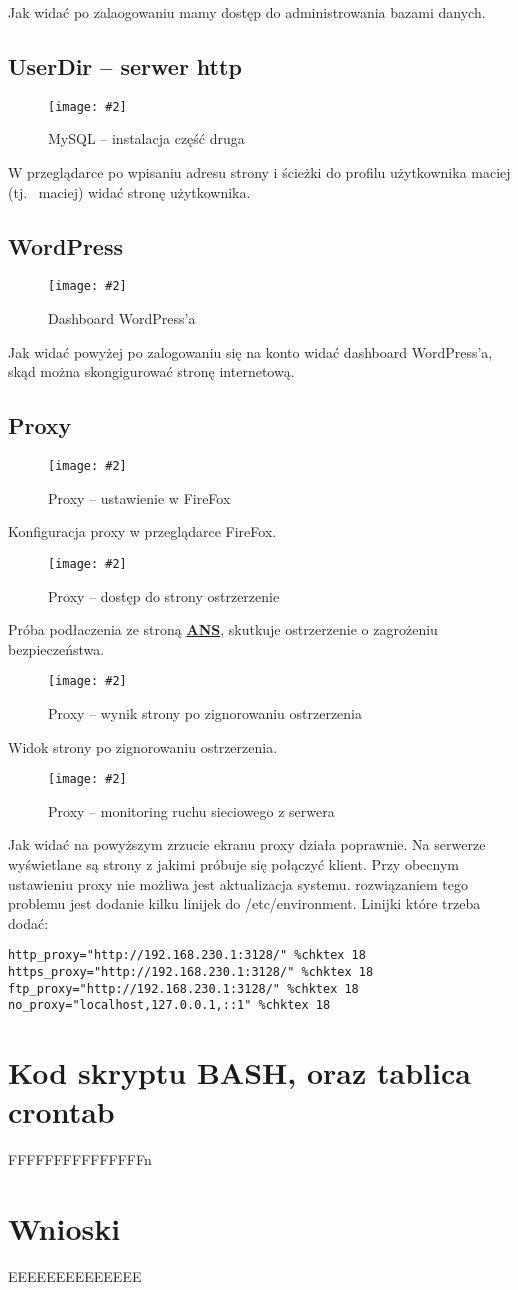 \documentclass[a4paper]{article}
\newcommand*{\zdj}[2][\textwidth]{\texttt{[image: \#2]}}
\newcommand*{\fg}[4][!htb]{
      \begin{figure*}[#1]
            \zdj{#2}
            \caption[#4]{#3}
      \end{figure*}
}
\newcommand*{\fgc}[5][!htb]{
      \begin{figure*}[#1]
            \phantomsection\label{fig:#5}
            \zdj{#2}
            \caption[#4]{#3}
      \end{figure*}
}
\begin{document}
Jak widać po zalaogowaniu mamy dostęp do administrowania bazami danych.
\newpage
\subsection{UserDir – serwer http}
\fgc{contents/configuration/UserDir/5.png}{MySQL – instalacja część druga}{MySQL – instalacja część druga}{UserDir-test}
W przeglądarce po wpisaniu adresu strony i ścieżki do profilu użytkownika maciej (tj. ~maciej) widać stronę użytkownika.
\subsection{WordPress}
\fgc{contents/configuration/wordpress/7.png}{Dashboard WordPress'a}{Dashboard WordPress'a}{wordpress-test}

Jak widać powyżej po zalogowaniu się na konto widać dashboard WordPress'a, skąd można skongigurować stronę internetową. 

\subsection{Proxy}
\fgc{contents/configuration/Proxy/6.png}{Proxy – ustawienie w FireFox}{Proxy – ustawienie w FireFox}{proxy-test}
Konfiguracja proxy w przeglądarce FireFox.

\fg{contents/configuration/Proxy/7.png}{Proxy – dostęp do strony ostrzerzenie}{Proxy – dostęp do strony ostrzerzenie}

Próba podłaczenia ze stroną \href{http://ans-ns.edu.pl}{\textbf{ANS}}, skutkuje ostrzerzenie o zagrożeniu bezpieczeństwa. 
\fg{contents/configuration/Proxy/8.png}{Proxy – wynik strony po zignorowaniu ostrzerzenia}{Proxy – wynik strony po zignorowaniu ostrzerzenia}

\newpage
Widok strony po zignorowaniu ostrzerzenia. 
\fg{contents/configuration/Proxy/9.png}{Proxy – monitoring ruchu sieciowego z serwera}{Proxy – monitoring ruchu sieciowego z serwera}

Jak widać na powyższym zrzucie ekranu proxy działa poprawnie. Na serwerze wyświetlane są strony z jakimi próbuje się połączyć klient. Przy obecnym ustawieniu proxy nie możliwa jest aktualizacja systemu. rozwiązaniem tego problemu jest dodanie kilku linijek do /etc/environment. Linijki które trzeba dodać:
\begin{Verbatim}[frame=single]
http_proxy="http://192.168.230.1:3128/" %chktex 18
https_proxy="http://192.168.230.1:3128/" %chktex 18
ftp_proxy="http://192.168.230.1:3128/" %chktex 18
no_proxy="localhost,127.0.0.1,::1" %chktex 18
\end{Verbatim}
\newpage
\section{Kod skryptu BASH, oraz tablica crontab}
FFFFFFFFFFFFFFFn
\section{Wnioski}
EEEEEEEEEEEEEE
\newpage
\nocite{k8s-docs}
\nocite{k8s-blog}
\nocite{k8s-github}
\printbibliography[heading=bibnumbered, label=Literatura, title=Literatura]
\end{document}
